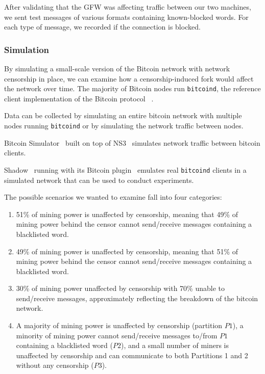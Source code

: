 After validating that the GFW was affecting traffic between our two machines, we sent test messages of various formats containing known-blocked words. For each type of message, we recorded if the connection is blocked.

\subsubsection{Simulation}
By simulating a small-scale version of the Bitcoin network with network censorship in place, we can examine how a censorship-induced fork would affect the network over time. The majority of Bitcoin nodes run \texttt{bitcoind}, the reference client implementation of the Bitcoin protocol ~\cite{shadow-bitcoin}.

Data can be collected by simulating an entire bitcoin network with multiple nodes running \texttt{bitcoind} or by simulating the network traffic between nodes.

Bitcoin Simulator~\cite{bitcoin-simulator} built on top of NS3~\cite{NS3} simulates network traffic between bitcoin clients. %

Shadow~\cite{shadow} running with its Bitcoin plugin~\cite{shadow-bitcoin} emulates real \texttt{bitcoind} clients in a simulated network that can be used to conduct experiments.

The possible scenarios we wanted to examine fall into four categories:
\begin{enumerate}
\item 51\% of mining power is unaffected by censorship, meaning that 49\% of mining power behind the censor cannot send/receive messages containing a blacklisted word.
\item 49\% of mining power is unaffected by censorship, meaning that 51\% of mining power behind the censor cannot send/receive messages containing a blacklisted word.
\item 30\% of mining power unaffected by censorship with 70\% unable to send/receive messages, approximately reflecting the breakdown of the bitcoin network.
\item A majority of mining power is unaffected by censorship (partition $P1$), a minority of mining power cannot send/receive messages to/from $P1$ containing a blacklisted word ($P2$), and a small number of miners is unaffected by censorship and can communicate to both Partitions 1 and 2 without any censorship ($P3$).
\end{enumerate}